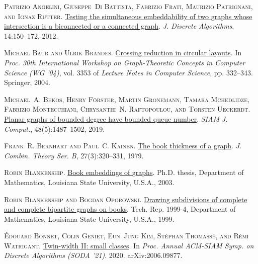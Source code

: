 \documentclass[kpfonts]{patmorin}
\begin{document}
	\textsc{Patrizio Angelini, Giuseppe~Di Battista, Fabrizio Frati, Maurizio
		Patrignani, and Ignaz Rutter}.
	\newblock \href{https://doi.org/10.1016/j.jda.2011.12.015}{Testing the
		simultaneous embeddability of two graphs whose intersection is a biconnected
		or a connected graph}.
	\newblock \emph{J. Discrete Algorithms}, 14:150--172, 2012.
	
	\textsc{Michael Baur and Ulrik Brandes}.
	\newblock \href{https://doi.org/10.1007/978-3-540-30559-0\_28}{Crossing
		reduction in circular layouts}.
	\newblock In \emph{Proc. 30th International Workshop on Graph-Theoretic
		Concepts in Computer Science (WG '04)}, vol. 3353 of \emph{Lecture Notes in
		Computer Science}, pp. 332--343. Springer, 2004.
	
	\textsc{Michael~A. Bekos, Henry F{\"{o}}rster, Martin Gronemann, Tamara
		Mchedlidze, Fabrizio Montecchiani, Chrysanthi~N. Raftopoulou, and Torsten
		Ueckerdt}.
	\newblock \href{https://doi.org/10.1137/19M125340X}{Planar graphs of bounded
		degree have bounded queue number}.
	\newblock \emph{SIAM J. Comput.}, 48(5):1487--1502, 2019.
	
	\textsc{Frank~R. Bernhart and Paul~C. Kainen}.
	\newblock \href{https://doi.org/10.1016/0095-8956(79)90021-2}{The book
		thickness of a graph}.
	\newblock \emph{J. Combin. Theory Ser. B}, 27(3):320--331, 1979.
	
	\textsc{Robin Blankenship}.
	\newblock
	\href{http://etd.lsu.edu/docs/available/etd-0709103-163907/unrestricted/Blankenship_dis.pdf}{Book
		embeddings of graphs}.
	\newblock Ph.D. thesis, Department of Mathematics, Louisiana State University,
	U.S.A., 2003.
	
	\textsc{Robin Blankenship and Bogdan Oporowski}.
	\newblock \href{http://www.math.lsu.edu/~preprint/1999/rbbo991.ps}{Drawing
		subdivisions of complete and complete bipartite graphs on books}.
	\newblock Tech. Rep. 1999-4, Department of Mathematics, Louisiana State
	University, U.S.A., 1999.
	
	\textsc{\'Edouard Bonnet, Colin Geniet, Eun~Jung Kim, St\'ephan Thomass\'e, and
		R\'emi Watrigant}.
	\newblock \href{http://arxiv.org/abs/2006.09877}{Twin-width {II}: small
		classes}.
	\newblock In \emph{Proc. Annual ACM-SIAM Symp. on Discrete Algorithms (SODA
		'21)}. 2020{}.
	\newblock arXiv:2006.09877.
	
\end{document}
